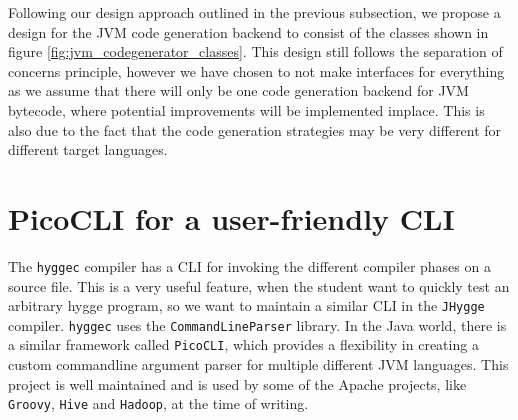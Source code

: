Following our design approach outlined in the previous subsection, we propose a design for the JVM code generation backend to consist of the
classes shown in figure \ref{fig:jvm_codegenerator_classes}. This design still follows the separation of concerns principle, however we have chosen to not make interfaces for everything
as we assume that there will only be one code generation backend for JVM bytecode, where potential improvements will be implemented implace.
This is also due to the fact that the code generation strategies may be very different for different target languages.

\section{PicoCLI for a user-friendly CLI}

The \texttt{hyggec} compiler has a CLI for invoking the different compiler phases on a source file. This is a very useful feature,
when the student want to quickly test an arbitrary hygge program, so we want to maintain a similar CLI in the \texttt{JHygge} compiler.
\texttt{hyggec} uses the \texttt{CommandLineParser}\cite{commandlineparser} library. In the Java world, there is a similar framework called \texttt{PicoCLI}\cite{picocli},
which provides a flexibility in creating a custom commandline argument parser for multiple different JVM languages. This project
is well maintained and is used by some of the Apache projects, like \texttt{Groovy}, \texttt{Hive} and \texttt{Hadoop}, at the time of writing.
